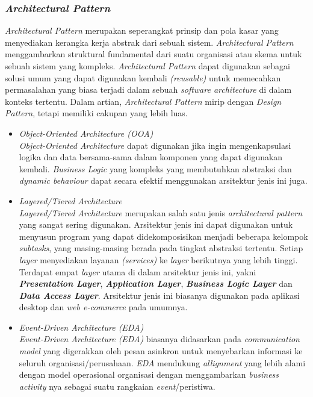 \documentclass[a4paper]{article}
\newcommand{\subsubbab}[1]{%
    \subsubsection{#1}%
}
\begin{document}
\subsubbab{\textit{Architectural Pattern}}
\textit{Architectural Pattern} merupakan seperangkat prinsip dan pola kasar yang menyediakan kerangka kerja abstrak dari sebuah sistem. \textit{Architectural Pattern} menggambarkan struktural fundamental dari suatu organisasi atau skema untuk sebuah sistem yang kompleks. \textit{Architectural Pattern} dapat digunakan sebagai solusi umum yang dapat digunakan kembali \textit{(reusable)} untuk memecahkan permasalahan yang biasa terjadi dalam sebuah \textit{software architecture} di dalam konteks tertentu\autocite{architectural-pattern}. Dalam artian, \textit{Architectural Pattern} mirip dengan \textit{Design Pattern}, tetapi memiliki cakupan yang lebih luas\autocite{archi-pattern}.
\begin{itemize}
    \item \textit{Object-Oriented Architecture (OOA)}\\
          \textit{Object-Oriented Architecture} dapat digunakan jika ingin mengenkapsulasi logika dan data bersama-sama dalam komponen yang dapat digunakan kembali. \textit{Business Logic} yang kompleks yang membutuhkan abstraksi dan \textit{dynamic behaviour} dapat secara efektif menggunakan arsitektur jenis ini juga\autocite{architectural-pattern}.
    \item \textit{Layered/Tiered Architecture}\\
          \textit{Layered/Tiered Architecture} merupakan salah satu jenis \textit{architectural pattern} yang sangat sering digunakan\autocite{architectural-pattern}. Arsitektur jenis ini dapat digunakan untuk menyusun program yang dapat didekomposisikan menjadi beberapa kelompok \textit{subtasks}, yang masing-masing berada pada tingkat abstraksi tertentu. Setiap \textit{layer} menyediakan layanan \textit{(services)} ke \textit{layer} berikutnya yang lebih tinggi. Terdapat empat \textit{layer} utama di dalam arsitektur jenis ini, yakni \textbf{\textit{Presentation Layer}}, \textbf{\textit{Application Layer}}, \textbf{\textit{Business Logic Layer}} dan \textbf{\textit{Data Access Layer}}. Arsitektur jenis ini biasanya digunakan pada aplikasi desktop dan \textit{web e-commerce} pada umumnya\autocite{archi-pattern}.
    \item \textit{Event-Driven Architecture (EDA)}\\
          \textit{Event-Driven Architecture (EDA)} biasanya didasarkan pada \textit{communication model} yang digerakkan oleh pesan asinkron untuk menyebarkan informasi ke seluruh organisasi/perusahaan. \textit{EDA} mendukung \textit{allignment} yang lebih alami dengan model operasional organisasi dengan menggambarkan \textit{business activity} nya sebagai suatu rangkaian \textit{event}/peristiwa\autocite{architectural-pattern}.

\end{itemize}
\end{document}
